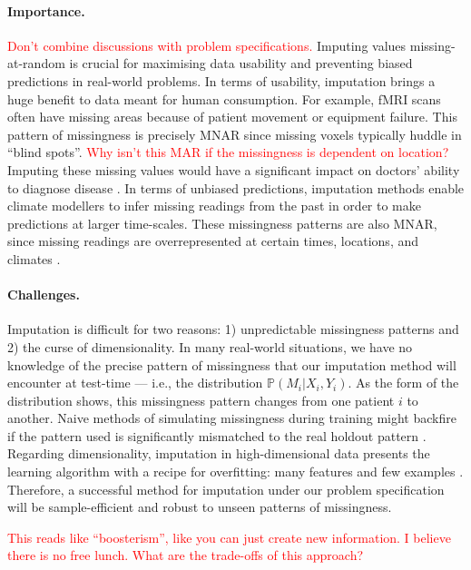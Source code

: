 \documentclass[a4paper,12pt,twoside,openright]{article}
\newcommand{\crit}[1]{\textcolor{red}{#1}}
\begin{document}
\paragraph{Importance.} \crit{Don't combine discussions with problem specifications.} Imputing values missing-at-random is crucial for maximising data usability and preventing biased predictions in real-world problems. In terms of usability, imputation brings a huge benefit to data meant for human consumption. For example, fMRI scans often have missing areas because of patient movement or equipment failure. This pattern of missingness is precisely MNAR since missing voxels typically huddle in ``blind spots''. \crit{Why isn't this MAR if the missingness is dependent on location?} Imputing these missing values would have a significant impact on doctors' ability to diagnose disease \parencite{vadenMultipleImputationMissing2012}. In terms of unbiased predictions, imputation methods enable climate modellers to infer missing readings from the past in order to make predictions at larger time-scales. These missingness patterns are also MNAR, since missing readings are overrepresented at certain times, locations, and climates \parencite{kadowArtificialIntelligenceReconstructs2020}. 

\paragraph{Challenges.} Imputation is difficult for two reasons: 1) unpredictable missingness patterns and 2) the curse of dimensionality. In many real-world situations, we have no knowledge of the precise pattern of missingness that our imputation method will encounter at test-time --- i.e., the distribution $\mathbb{P} (M_i | X_i, Y_i)$. As the form of the distribution shows, this missingness pattern changes from one patient $i$ to another. Naive methods of simulating missingness during training might backfire if the pattern used is significantly mismatched to the real holdout pattern \parencite{schaferMissingDataOur2002}. Regarding dimensionality, imputation in high-dimensional data presents the learning algorithm with a recipe for overfitting: many features and few examples \parencite{azurMultipleImputationChained2011}. Therefore, a successful method for imputation under our problem specification will be sample-efficient and robust to unseen patterns of missingness. 

\crit{This reads like ``boosterism'', like you can just create new information. I believe there is no free lunch. What are the trade-offs of this approach?}
\end{document}
